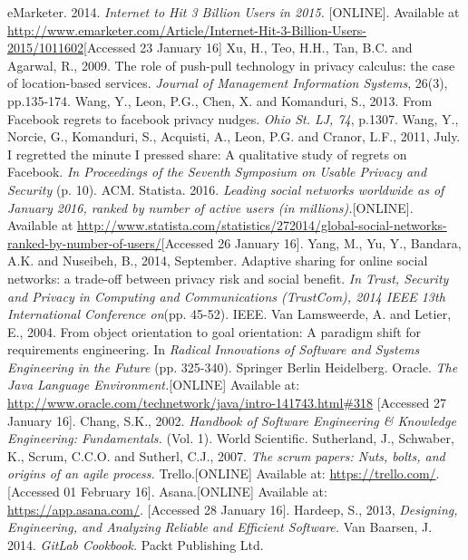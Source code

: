 \documentclass[a4paper,11pt]{article}
\begin{document}

\begin{thebibliography}{9}
eMarketer. 2014. 
\emph{Internet to Hit 3 Billion Users in 2015.} [ONLINE]. Available at
\url{http://www.emarketer.com/Article/Internet-Hit-3-Billion-Users-2015/1011602}[Accessed 23 January 16]
	Xu, H., Teo, H.H., Tan, B.C. and Agarwal, R., 2009.
	The role of push-pull technology in privacy calculus: the case of location-based services.
	\emph{Journal of Management Information Systems},
	26(3), pp.135-174. 
	Wang, Y., Leon, P.G., Chen, X. and Komanduri, S., 2013. From Facebook regrets to facebook privacy nudges.
	\emph{Ohio St. LJ, 74}, p.1307.
	Wang, Y., Norcie, G., Komanduri, S., Acquisti, A., Leon, P.G. and Cranor, L.F., 2011, July. I regretted the minute I pressed share: A qualitative study of regrets on Facebook. 
	\emph{In Proceedings of the Seventh Symposium on Usable Privacy and Security} (p. 10). ACM.
	Statista. 2016. 
	\emph{Leading social networks worldwide as of January 2016, ranked by number of active users (in millions).}[ONLINE]. 				Available at \url{http://www.statista.com/statistics/272014/global-social-networks-ranked-by-number-of-users/}[Accessed 26
	January 16].
	Yang, M., Yu, Y., Bandara, A.K. and Nuseibeh, B., 2014, September. 
	Adaptive sharing for online social networks: a trade-off between privacy risk and social benefit.
	\emph{In Trust, Security and Privacy in Computing and Communications (TrustCom), 2014 IEEE 13th International Conference on}(pp. 45-52). IEEE.
	Van Lamsweerde, A. and Letier, E., 2004. From object orientation to goal orientation: A paradigm shift for requirements engineering. In \emph{Radical Innovations of Software and Systems Engineering in the Future} (pp. 325-340). Springer Berlin Heidelberg.
	 Oracle.
	\emph{The Java Language Environment.}[ONLINE] Available at: 			\url{http://www.oracle.com/technetwork/java/intro-141743.html\#318} [Accessed 27 January 16].
	Chang, S.K., 2002. 
	\emph{Handbook of Software Engineering \& Knowledge Engineering: Fundamentals.} (Vol. 1). World Scientific. 
	Sutherland, J., Schwaber, K., Scrum, C.C.O. and Sutherl, C.J., 2007. 
	\emph{The scrum papers: Nuts, bolts, and origins of an agile process.} 
	Trello.[ONLINE] Available at: \url{https://trello.com/}. [Accessed 01 February 16].
	Asana.[ONLINE] Available at: \url{https://app.asana.com/}. [Accessed 28 January 16].
	Hardeep, S., 2013, 
	\emph{Designing, Engineering, and Analyzing Reliable and Efficient Software.}
	Van Baarsen, J. 2014.
	\emph{GitLab Cookbook.} Packt Publishing Ltd.

\end{thebibliography}
\end{document}
